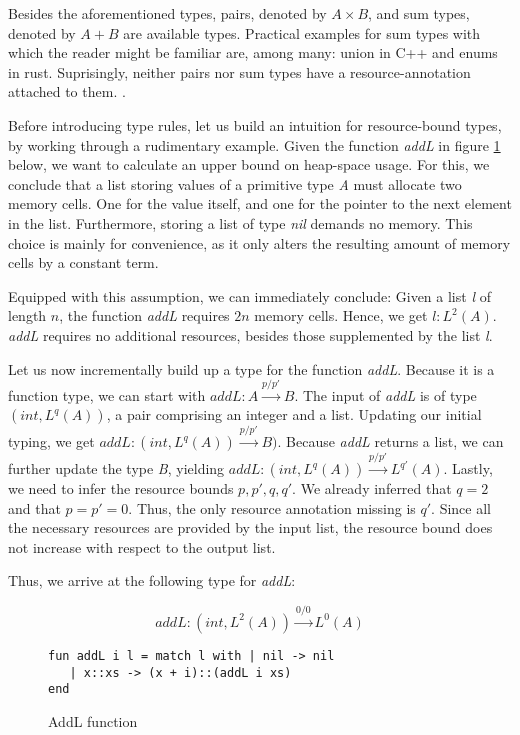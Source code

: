Besides the aforementioned types, pairs, denoted by \(A \times B\), and sum types, denoted by \(A + B\) are available types. Practical examples for sum types with which the reader might be familiar are, among many: union in C++ and enums in rust. 
Suprisingly, neither pairs nor sum types have a resource-annotation attached to them. .

Before introducing type rules, let us build an intuition for resource-bound types, by working through a rudimentary example. Given the function \emph{addL} in figure \ref{func:add-l} below, we want to calculate an upper bound on heap-space usage. For this, we conclude that a list storing values of a primitive type \emph{A} must allocate two memory cells. One for the value itself, and one for the pointer to the next element in the list. Furthermore, storing a list of type \emph{nil} demands no memory.
This choice is mainly for convenience, as it only alters the resulting amount of memory cells by a constant term.

Equipped with this assumption, we can immediately conclude: Given a list \emph{l} of length \(n\), the function \emph{addL} requires \(2n\) memory cells. Hence, we get \(l : L^{2}(A)\). \emph{addL} requires no additional resources, besides those supplemented by the list \emph{l}. 

Let us now incrementally build up a type for the function \emph{addL}. Because it is a function type, we can start with \(addL: A \xrightarrow{p/p'} B\). The input of \emph{addL} is of type \((int, L^{q}(A))\), a pair comprising an integer and a list. Updating our initial typing, we get \(addL : (int, L^{q}(A)) \xrightarrow{p/p'} B)\). Because \emph{addL} returns a list, we can further update the type \emph{B}, yielding \(addL: (int, L^{q}(A)) \xrightarrow{p/p'} L^{q'}(A)\). Lastly, we need to infer the resource bounds \(p, p', q, q'\). We already inferred that \(q = 2\) and that \(p = p' = 0\). Thus, the only resource annotation missing is \(q'\). Since all the necessary resources are provided by the input list, the resource bound does not increase with respect to the output list. 

Thus, we arrive at the following type for \emph{addL}:

\[addL: (int, L^{2}(A)) \xrightarrow{0/0} L^{0}(A) \]

\begin{figure}[H]
\centering
\begin{verbatim}
fun addL i l = match l with | nil -> nil
   | x::xs -> (x + i)::(addL i xs)
end
\end{verbatim}
\caption{AddL function}
\label{func:add-l}
\end{figure}

